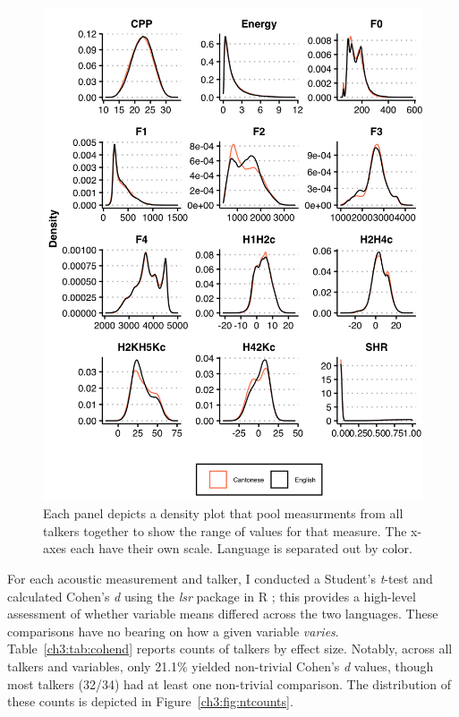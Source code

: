 \begin{figure}[htbp]
    \begin{center}
    \includegraphics[width=0.9\linewidth]{figures/ch3_allmeasuresdensity_5in.png} 
    \caption{Each panel depicts a density plot that pool measurments from all talkers together to show the range of values for that measure. The x-axes each have their own scale. Language is separated out by color.}
    \label{ch3:fig:allmeasures}
    \end{center}
\end{figure}

For each acoustic measurement and talker, I conducted a Student's \textit{t}-test and calculated Cohen's \textit{d} using the \textit{lsr} package \citep{navarro_2015_lsr} in R \citep{r_2021}; this provides a high-level assessment of whether variable means differed across the two languages. These comparisons have no bearing on how a given variable \textit{varies}. Table~\ref{ch3:tab:cohend} reports counts of talkers by effect size. Notably, across all talkers and variables, only 21.1\% yielded non-trivial Cohen's \textit{d} values, though most talkers (32/34) had at least one non-trivial comparison. The distribution of these counts is depicted in Figure~\ref{ch3:fig:ntcounts}. 

